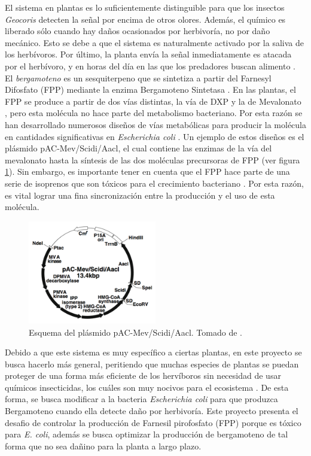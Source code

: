 \documentclass[12pt]{article}
\begin{document}
El sistema en plantas es lo suficientemente distinguible para que los insectos \emph{Geocoris} detecten la señal por encima de otros olores. Además, el químico es liberado s\'olo cuando hay daños ocasionados por herbivor\'ia, no por daño mec\'anico. Esto se debe a que el sistema es naturalmente activado por la saliva de los herb\'ivoros. Por \'ultimo, la planta env\'ia la se\~nal inmediatamente es atacada por el herb\'ivoro, y en horas del d\'ia en las que los predadores buscan alimento \cite{turlings95}.\\

El \emph{bergamoteno} es un sesquiterpeno que se sintetiza a partir del Farnesyl Difosfato (FPP) mediante la enzima Bergamoteno Sintetasa \cite{sallaud09}. En las plantas, el FPP se produce a partir de dos v\'ias distintas, la v\'ia de DXP y la de Mevalonato \cite{kirby09}, pero esta mol\'ecula no hace parte del metabolismo bacteriano. Por esta raz\'on se han desarrollado numerosos dise\~nos de v\'ias metab\'olicas para producir la mol\'ecula en cantidades significativas en \emph{Escherichia coli} \cite{harada09b}. Un ejemplo de estos dise\~nos es el pl\'asmido pAC-Mev/Scidi/Aacl, el cual contiene las enzimas de la v\'ia del mevalonato hasta la s\'intesis de las dos mol\'eculas precursoras de FPP (ver figura \ref{fig:pac}). Sin embargo, es importante tener en cuenta que el FPP hace parte de una serie de isoprenos que son t\'oxicos para el crecimiento bacteriano \cite{harada09b}. Por esta raz\'on, es vital lograr una fina sincronizaci\'on entre la producci\'on y el uso de esta mol\'ecula.\\

\begin{figure}[H]
  \centering
  \includegraphics[width=0.5\textwidth]{aaaa.png}
  \caption{\label{fig:pac} Esquema del pl\'asmido pAC-Mev/Scidi/Aacl. Tomado de \cite{harada09b}.}
 \end{figure}


Debido a que este sistema es muy espec\'ifico a ciertas plantas, en este proyecto se busca hacerlo m\'as general, peritiendo que muchas especies de plantas se puedan proteger de una forma m\'as eficiente de los herv\'iboros sin necesidad de usar qu\'imicos insecticidas, los cu\'ales son muy nocivos para el ecosistema . De esta forma, se busca modificar a la bacteria \emph{Escherichia coli}  para que produzca Bergamoteno cuando ella detecte da\~no por herbivor\'ia. Este proyecto presenta el desafio de controlar la producci\'on de Farnesil pirofosfato (FPP) porque es t\'oxico para \emph{E. coli}, adem\'as se busca optimizar la producci\'on de bergamoteno de tal forma que no sea da\~nino para la planta a largo plazo. 
\end{document}
